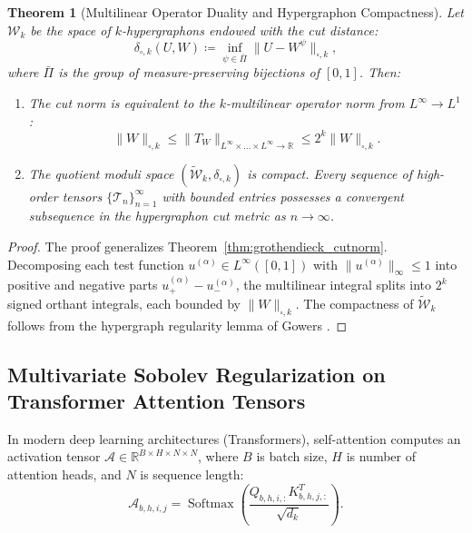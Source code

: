 \documentclass[11pt,a4paper,reqno]{amsart}
\newtheorem{theorem}{Theorem}[section]
\theoremstyle{definition}
\numberwithin{equation}{section}
\newcommand{\R}{\mathbb{R}}
\begin{document}
\begin{theorem}[Multilinear Operator Duality and Hypergraphon Compactness]
\label{thm:hypergraphon_compactness}
Let $\mathcal{W}_k$ be the space of $k$-hypergraphons endowed with the cut distance:
\begin{equation}
    \delta_{\square, k}(U, W) \coloneqq \inf_{\psi \in \bar{\Pi}} \|U - W^\psi\|_{\square, k},
\end{equation}
where $\bar{\Pi}$ is the group of measure-preserving bijections of $[0, 1]$. Then:
\begin{enumerate}[label=(\roman*)]
    \item The cut norm is equivalent to the $k$-multilinear operator norm from $L^\infty \to L^1$:
    \begin{equation}
        \|W\|_{\square, k} \le \|T_W\|_{L^\infty \times \dots \times L^\infty \to \R} \le 2^k \|W\|_{\square, k}.
    \end{equation}
    \item The quotient moduli space $(\widetilde{\mathcal{W}}_k, \delta_{\square, k})$ is \emph{compact}. Every sequence of high-order tensors $\{\mathcal{T}_n\}_{n=1}^\infty$ with bounded entries possesses a convergent subsequence in the hypergraphon cut metric as $n \to \infty$.
\end{enumerate}
\end{theorem}
\begin{proof}
The proof generalizes Theorem~\ref{thm:grothendieck_cutnorm}. Decomposing each test function $u^{(\alpha)} \in L^\infty([0, 1])$ with $\|u^{(\alpha)}\|_\infty \le 1$ into positive and negative parts $u_+^{(\alpha)} - u_-^{(\alpha)}$, the multilinear integral splits into $2^k$ signed orthant integrals, each bounded by $\|W\|_{\square, k}$. The compactness of $\widetilde{\mathcal{W}}_k$ follows from the hypergraph regularity lemma of Gowers \cite{lovasz2012large}.
\end{proof}

\subsection{Multivariate Sobolev Regularization on Transformer Attention Tensors}
\label{subsec:transformer_tensors}

In modern deep learning architectures (Transformers), self-attention computes an activation tensor $\mathcal{A} \in \R^{B \times H \times N \times N}$, where $B$ is batch size, $H$ is number of attention heads, and $N$ is sequence length:
\begin{equation}
    \mathcal{A}_{b, h, i, j} = \operatorname{Softmax}\left( \frac{Q_{b, h, i, :} K_{b, h, j, :}^T}{\sqrt{d_k}} \right).
\end{equation}
\end{document}
